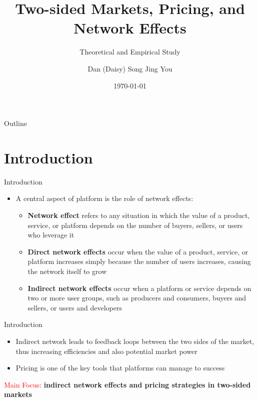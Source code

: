 \documentclass[aspectratio=169]{beamer}  %
\title{Two-sided Markets, Pricing, and Network Effects}
\subtitle{Theoretical and Empirical Study}
\author{Dan (Daisy) Song \quad Jing You}
\institute{Hong Kong University of Science and Technology}
\date{\today}
\begin{document}
\begin{frame}
    \titlepage
\end{frame}

\begin{frame}{Outline}
    \tableofcontents
\end{frame}

\section{Introduction}
\begin{frame}{Introduction}
    \begin{itemize}
        \item A central aspect of platform is the role of network effects:
        \vspace{1em}
        \begin{itemize}
            \item \textbf{Network effect} refers to any situation in which the value of a product, service, or platform depends on the number of buyers, sellers, or users who leverage it
            \vspace{1em}
            \item \textbf{Direct network effects} occur when the value of a product, service, or platform increases simply because the number of users increases, causing the network itself to grow
            \vspace{1em}
            \item \textbf{Indirect network effects} occur when a platform or service depends on two or more user groups, such as producers and consumers, buyers and sellers, or users and developers
        \end{itemize}

    \end{itemize}
\end{frame}

\begin{frame}{Introduction}
    \begin{itemize}        
        \item Indirect network leads to feedback loops between the two sides of the market, thus increasing efficiencies and also potential market power
        \vspace{1em}
        \item Pricing is one of the key tools that platforms can manage to success
    \end{itemize}
    \vspace{2em}

    \textcolor{red}{Main Focus}: \textbf{indirect network effects and pricing strategies in two-sided markets}
\end{frame}
\end{document}
